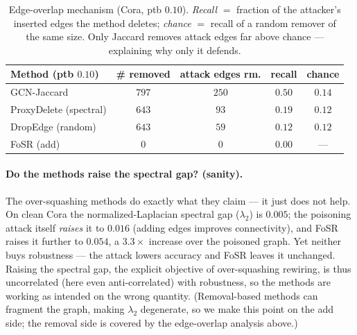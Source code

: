\documentclass[10pt]{article}
\begin{document}
\begin{table}[h]
\centering\small
\begin{tabular}{@{}lcccc@{}}
\toprule
\textbf{Method} (ptb $0.10$) & \textbf{\# removed} & \textbf{attack edges rm.} & \textbf{recall} & \textbf{chance} \\
\midrule
GCN-Jaccard           & $797$ & $250$ & $\mathbf{0.50}$ & $0.14$ \\
ProxyDelete (spectral)& $643$ & $93$  & $0.19$ & $0.12$ \\
DropEdge (random)     & $643$ & $59$  & $0.12$ & $0.12$ \\
FoSR (add)            & $0$   & $0$   & $0.00$ & --- \\
\bottomrule
\end{tabular}
\caption{Edge-overlap mechanism (Cora, ptb $0.10$). \emph{Recall} $=$ fraction of the attacker's
inserted edges the method deletes; \emph{chance} $=$ recall of a random remover of the same size. Only
Jaccard removes attack edges far above chance --- explaining why only it defends.}
\label{tab:overlap}
\end{table}

\paragraph{Do the methods raise the spectral gap? (sanity).} The over-squashing methods do exactly what
they claim --- it just does not help. On clean Cora the normalized-Laplacian spectral gap ($\lambda_2$)
is $0.005$; the poisoning attack itself \emph{raises} it to $0.016$ (adding edges improves connectivity),
and FoSR raises it further to $0.054$, a $3.3\times$ increase over the poisoned graph. Yet neither buys
robustness --- the attack lowers accuracy and FoSR leaves it unchanged. Raising the spectral gap, the
explicit objective of over-squashing rewiring, is thus uncorrelated (here even anti-correlated) with
robustness, so the methods are working as intended on the wrong quantity. (Removal-based methods can
fragment the graph, making $\lambda_2$ degenerate, so we make this point on the add side; the removal
side is covered by the edge-overlap analysis above.)
\end{document}
